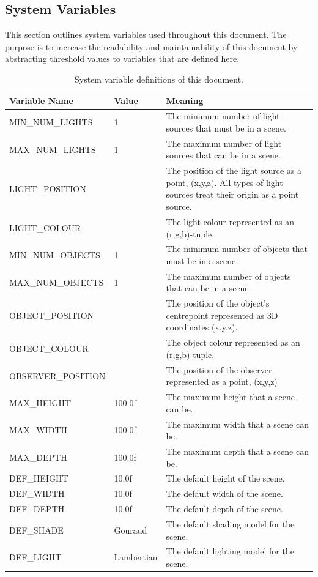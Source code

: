 \documentclass[12pt]{article}
\begin{document}
\subsection{System Variables}
This section outlines system variables used throughout this document. The 
purpose is to increase the readability and maintainability of this document by 
abstracting threshold values to variables that are defined here.

\begin{table}[H]
	\begin{tabular}{|l|l|p{9cm}|}
		\hline
		\textbf{Variable Name} & \textbf{Value}& \textbf{Meaning} \\
		\hline
		MIN\_NUM\_LIGHTS & 1 & The minimum number of light sources that must be 
		in a scene.\\
		MAX\_NUM\_LIGHTS & 1 & The maximum number of light sources that can be 
		in a scene.\\
		LIGHT\_POSITION & & The position of the light source as a point, 
		(x,y,z). All types of light sources treat their origin as a point 
		source.\\
		LIGHT\_COLOUR & & The light colour represented as an (r,g,b)-tuple.\\
		MIN\_NUM\_OBJECTS & 1 & The minimum number of objects that must be in a 
		scene. \\
		MAX\_NUM\_OBJECTS & 1 & The maximum number of objects that can be in a 
		scene. \\
		OBJECT\_POSITION & & The position of the object's centrepoint 
		represented as 3D coordinates (x,y,z).\\
		OBJECT\_COLOUR & & The object colour represented as an (r,g,b)-tuple.\\
		OBSERVER\_POSITION & & The position of the observer represented as a 
		point, (x,y,z)\\
		MAX\_HEIGHT & 100.0f & The maximum height that a scene can be.\\
		MAX\_WIDTH & 100.0f & The maximum width that a scene can be.\\
		MAX\_DEPTH & 100.0f & The maximum depth that a scene can be.\\
		DEF\_HEIGHT & 10.0f & The default height of the scene.\\
		DEF\_WIDTH & 10.0f & The default width of the scene.\\
		DEF\_DEPTH & 10.0f & The default depth of the scene.\\
		DEF\_SHADE & Gouraud & The default shading model for the scene.\\
		DEF\_LIGHT & Lambertian & The default lighting model for the scene.\\
		\hline
	\end{tabular}
	\caption{System variable definitions of this document.}
	\label{tbl:system-variables}
\end{table}
\end{document}
